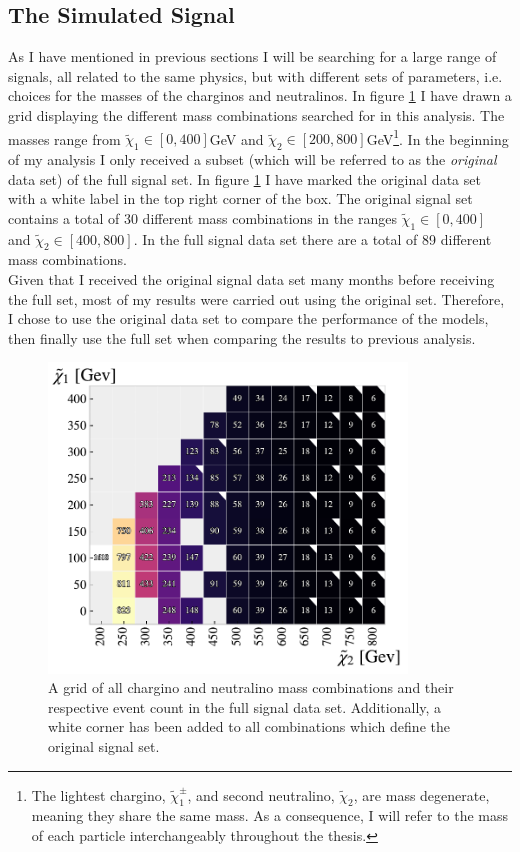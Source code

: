 \subsection{The Simulated Signal}\label{subsec:signal}
As I have mentioned in previous sections I will be searching for a large range of signals, all related to the same
physics, but with different sets of parameters, i.e. choices for the masses of the charginos and neutralinos. In figure \ref{fig:nrSignal} I have drawn a 
grid displaying the different mass combinations searched for in this analysis. The masses range from ${\tilde{\chi}_1}\in[0,400]$GeV
and ${\tilde{\chi}_2}\in[200,800]$GeV\footnote{The lightest chargino, $\tilde{\chi}^{\pm}_1$, and second neutralino, $\tilde{\chi}_2$, are mass degenerate, 
meaning they share the same mass. As a consequence, I will refer to the mass of each particle interchangeably throughout the thesis.}. In the beginning 
of my analysis I only received a subset (which will be referred to as the \emph{original} data set) of the full signal set. In figure \ref{fig:nrSignal} 
I have marked the original data set with a white label in the top right corner of the box. The original signal set contains a total of 30 different mass 
combinations in the ranges ${\tilde{\chi}_1}\in[0,400]$ and ${\tilde{\chi}_2}\in[400,800]$. In the full signal data set there are a total of 89 different 
mass combinations.
\\
Given that I received the original signal data set many months before receiving the full set, most of my results were carried out using the 
original set. Therefore, I chose to use the original data set to compare the performance of the models, then finally use the full set 
when comparing the results to previous analysis.
\begin{figure}
  \centering
  \includegraphics[width=0.85\textwidth]{Figures/MLResults/NN/SUSY/Grid/NrSignalEvents.pdf}
  \caption{A grid of all chargino and neutralino mass combinations and their respective event count in the full signal data set.
  Additionally, a white corner has been added to all combinations which define the original signal set.}
  \label{fig:nrSignal}
\end{figure}
